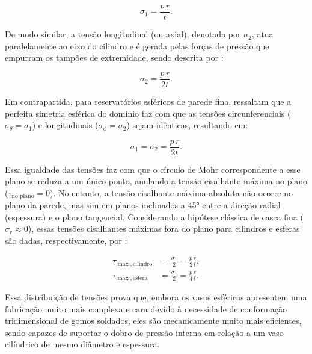 \begin{equation}
\sigma_1 = \frac{p \, r}{t}.
\end{equation} \label{eq-tensao-circunferencial}

De modo similar, a tensão longitudinal (ou axial), denotada por $\sigma_2$, atua paralelamente ao eixo do cilindro e é gerada pelas forças de pressão que empurram os tampões de extremidade, sendo descrita por \cite{beer1989resistencia}:

\begin{equation}
\sigma_2 = \frac{p \, r}{2t}.
\end{equation} \label{eq-tensao-longitudinal}


Em contrapartida, para reservatórios esféricos de parede fina,  ressaltam que a perfeita simetria esférica do domínio faz com que as tensões circunferenciais ($\sigma_\theta = \sigma_1$) e longitudinais ($\sigma_\phi = \sigma_2$) sejam idênticas, resultando em:

\begin{equation}
\sigma_1 = \sigma_2 = \frac{p \, r}{2t}.
\end{equation} \label{eq-tensao-esferica}

Essa igualdade das tensões faz com que o círculo de Mohr correspondente a esse plano se reduza a um único ponto, anulando a tensão cisalhante máxima no plano ($\tau_{\text{no plano}} = 0$). No entanto, a tensão cisalhante máxima absoluta não ocorre no plano da parede, mas sim em planos inclinados a 45° entre a direção radial (espessura) e o plano tangencial. Considerando a hipótese clássica de casca fina ($\sigma_r \approx 0$), essas tensões cisalhantes máximas fora do plano para cilindros e esferas são dadas, respectivamente, por \cite{beer1989resistencia}:

\begin{equation}
  \begin{aligned}
    \tau_{\max,\text{cilindro}} &= \frac{\sigma_1}{2} = \frac{p \, r}{2 \, t}, \\
    \tau_{\max,\text{esfera}} &= \frac{\sigma_1}{2} = \frac{p \, r}{4 \, t}.
  \end{aligned}
\end{equation}

Essa distribuição de tensões prova que, embora os vasos esféricos apresentem uma fabricação muito mais complexa e cara devido à necessidade de conformação tridimensional de gomos soldados, eles são mecanicamente muito mais eficientes, sendo capazes de suportar o dobro de pressão interna em relação a um vaso cilíndrico de mesmo diâmetro e espessura.

